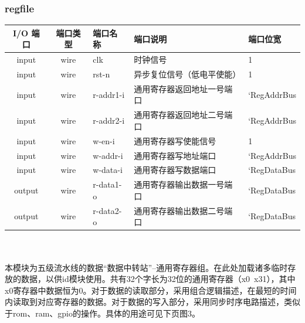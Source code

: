 \documentclass[lang=cn,11pt,a4paper]{elegantpaper}
\begin{document}
\subsubsection{regfile}
\begin{tabular}{cclll}
	\toprule
	I/O 端口 & 端口类型 &端口名称&端口说明 &端口位宽\\
	\midrule
	input &wire& clk & 时钟信号 & 1 \\
	input &wire& rst-n & 异步复位信号（低电平使能） & 1 \\
	
input &wire& r-addr1-i  & 通用寄存器返回地址一号端口 & `RegAddrBus  \\
input &wire& r-addr2-i  & 通用寄存器返回地址二号端口 & `RegAddrBus  \\
input &wire& w-en-i  & 通用寄存器写使能信号 & 1  \\
input &wire& w-addr-i  & 通用寄存器写地址端口 & `RegAddrBus  \\
input &wire& w-data-i  & 通用寄存器写数据端口 & `RegDataBus  \\

	
	output &wire& r-data1-o & 通用寄存器输出数据一号端口    & `RegDataBus   \\
	output &wire& r-data2-o & 通用寄存器输出数据二号端口    & `RegDataBus  \\
	\bottomrule
\end{tabular}\\
\\
本模块为五级流水线的数据“数据中转站”--通用寄存器组。在此处加载诸多临时存放的数据，以供id模块使用。共有32个字长为32位的通用寄存器（x0~x31），其中x0寄存器中数据恒为0。对于数据的读取部分，采用组合逻辑描述，在最短的时间内读取到对应寄存器的数据。对于数据的写入部分，采用同步时序电路描述，类似于rom、ram、gpio的操作。具体的用途可见下页图3。
\end{document}

